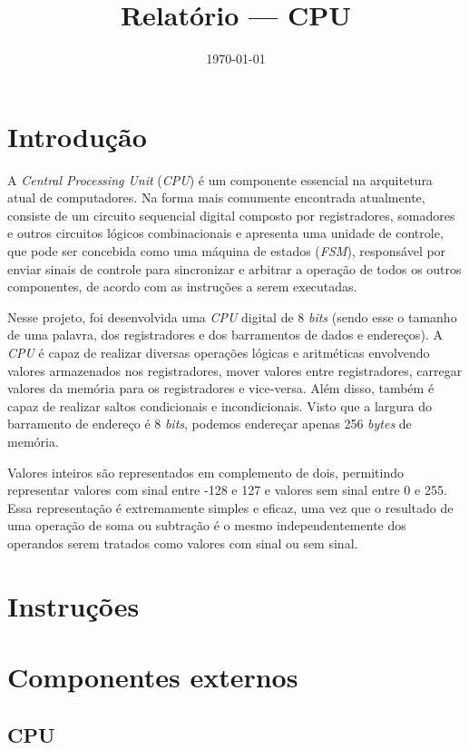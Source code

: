 \documentclass[a4paper,12pt]{report}
\title{Relatório --- CPU}
\date{\today}
\begin{document}
\maketitle

\section*{Introdução}

A \textit{Central Processing Unit} (\textit{CPU}) é um componente essencial
na arquitetura atual de computadores. Na forma mais comumente encontrada atualmente,
consiste de um circuito sequencial digital composto por registradores, somadores
e outros circuitos lógicos combinacionais e apresenta uma unidade de controle,
que pode ser concebida como uma máquina de estados (\textit{FSM}), responsável 
por enviar sinais de controle para sincronizar e arbitrar a operação de todos 
os outros componentes, de acordo com as instruções a serem executadas.

Nesse projeto, foi desenvolvida uma \textit{CPU} digital de 8 \textit{bits} (sendo
esse o tamanho de uma palavra, dos registradores e dos barramentos de dados e endereços).
A \textit{CPU} é capaz de realizar diversas operações lógicas e aritméticas 
envolvendo valores armazenados nos registradores, mover valores entre registradores,
carregar valores da memória para os registradores e vice-versa. Além disso, também é 
capaz de realizar saltos condicionais e incondicionais. Visto que a largura do 
barramento de endereço é 8 \textit{bits}, podemos endereçar apenas 256 \textit{bytes} 
de memória. 

Valores inteiros são representados em complemento de dois, permitindo
representar valores com sinal entre -128 e 127 e valores sem sinal entre 0 e 255.
Essa representação é extremamente simples e eficaz, uma vez que o resultado de
uma operação de soma ou subtração é o mesmo independentemente dos operandos serem 
tratados como valores com sinal ou sem sinal.

\section*{Instruções}

\section*{Componentes externos}

\subsection*{CPU}
\end{document}
